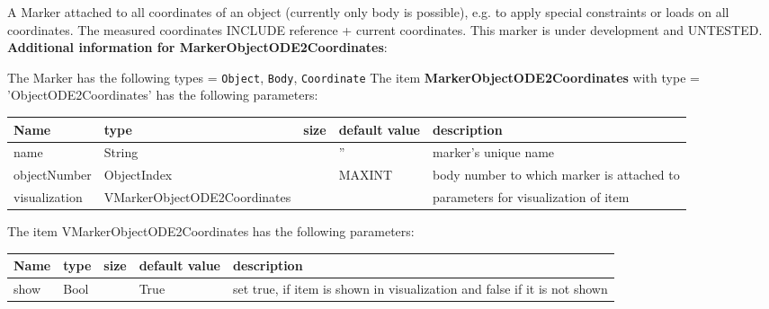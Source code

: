 \label{sec:item:MarkerObjectODE2Coordinates}
A Marker attached to all coordinates of an object (currently only body is possible), e.g. to apply special constraints or loads on all coordinates. The measured coordinates INCLUDE reference + current coordinates. This marker is under development and UNTESTED.\vspace{12pt}
 \\{\bf Additional information for MarkerObjectODE2Coordinates}:
\bi
  \item The Marker has the following types = \texttt{Object}, \texttt{Body}, \texttt{Coordinate}
\ei
\vspace{12pt} \noindent The item {\bf MarkerObjectODE2Coordinates} with type = 'ObjectODE2Coordinates' has the following parameters:\vspace{-1cm}\\ 
\begin{center}
  \footnotesize
  \begin{longtable}{| p{4.5cm} | p{2.5cm} | p{0.5cm} | p{2.5cm} | p{6cm} |}
    \hline
    \bf Name & \bf type & \bf size & \bf default value & \bf description \\ \hline
    name &     String &      &     '' &     marker's unique name\\ \hline
    objectNumber &     ObjectIndex &      &     MAXINT &     body number to which marker is attached to\\ \hline
    visualization & VMarkerObjectODE2Coordinates & & & parameters for visualization of item \\ \hline
	  \end{longtable}
	\end{center}
The item VMarkerObjectODE2Coordinates has the following parameters:\vspace{-1cm}\\ 
\begin{center}
  \footnotesize
  \begin{longtable}{| p{4.5cm} | p{2.5cm} | p{0.5cm} | p{2.5cm} | p{6cm} |}
    \hline
    \bf Name & \bf type & \bf size & \bf default value & \bf description \\ \hline
    show &     Bool &      &     True &     set true, if item is shown in visualization and false if it is not shown\\ \hline
	  \end{longtable}
	\end{center}
\newpage

